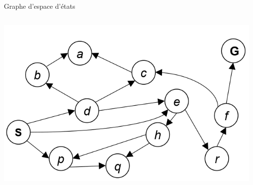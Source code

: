 \documentclass{beamer}
\begin{document}
\begin{frame}[t]{Graphe d'espace d'états}
\begin{columns}
\begin{column}{0.6\textwidth}
{ \includegraphics[width=1\textwidth,
 height=0.8\textheight]{./images/tiny_graphe.png}
      } 
    \end{column}
  \end{columns}
\end{frame}
\end{document}
